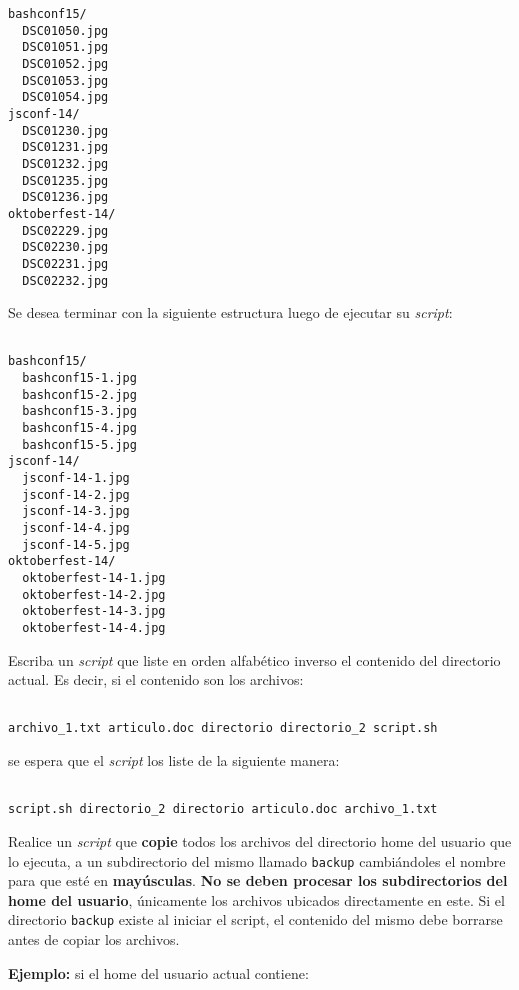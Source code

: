 \begin{questions}
\begin{lstlisting}
bashconf15/
  DSC01050.jpg
  DSC01051.jpg
  DSC01052.jpg
  DSC01053.jpg
  DSC01054.jpg
jsconf-14/
  DSC01230.jpg
  DSC01231.jpg
  DSC01232.jpg
  DSC01235.jpg
  DSC01236.jpg
oktoberfest-14/
  DSC02229.jpg
  DSC02230.jpg
  DSC02231.jpg
  DSC02232.jpg

  \end{lstlisting}

  Se desea terminar con la siguiente estructura luego de ejecutar su \textit{script}:

  \begin{lstlisting}

bashconf15/
  bashconf15-1.jpg
  bashconf15-2.jpg
  bashconf15-3.jpg
  bashconf15-4.jpg
  bashconf15-5.jpg
jsconf-14/
  jsconf-14-1.jpg
  jsconf-14-2.jpg
  jsconf-14-3.jpg
  jsconf-14-4.jpg
  jsconf-14-5.jpg
oktoberfest-14/
  oktoberfest-14-1.jpg
  oktoberfest-14-2.jpg
  oktoberfest-14-3.jpg
  oktoberfest-14-4.jpg

  \end{lstlisting}

\question Escriba un \textit{script} que liste en orden alfabético inverso el contenido
  del directorio actual. Es decir, si el contenido son los archivos:

  \begin{lstlisting}

archivo_1.txt articulo.doc directorio directorio_2 script.sh

  \end{lstlisting}

  se espera que el \textit{script} los liste de la siguiente manera:

  \begin{lstlisting}

script.sh directorio_2 directorio articulo.doc archivo_1.txt

  \end{lstlisting}

\question Realice un \textit{script} que \textbf{copie} todos los archivos del directorio home
  del usuario que lo ejecuta, a un subdirectorio del mismo llamado \texttt{backup} cambiándoles
  el nombre para que esté en \textbf{mayúsculas}. \textbf{No se deben procesar los subdirectorios
  del home del usuario}, únicamente los archivos ubicados directamente en este. Si el directorio
  \texttt{backup} existe al iniciar el script, el contenido del mismo debe borrarse antes de
  copiar los archivos.

  \textbf{Ejemplo:} si el home del usuario actual contiene:


\end{questions}
